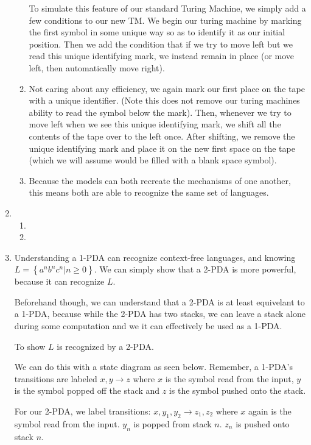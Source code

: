 \documentclass{article}
\newcommand{\set}[1]{{\left\{#1\right\}}}    %
\begin{document}
\begin{enumerate}
\begin{enumerate}
                To simulate this feature of our standard Turing Machine, we simply add a few conditions to our new TM.
                We begin our turing machine by marking the first symbol in some unique way so as to identify it as our initial position.
                Then we add the condition that if we try to move left but we read this unique identifying mark, we instead remain in place (or move left, then automatically move right).
            \item
                Not caring about any efficiency, we again mark our first place on the tape with a unique identifier. (Note this does not remove our turing machines ability to read the symbol below the mark).
                Then, whenever we try to move left when we see this unique identifying mark, we shift all the contents of the tape over to the left once.
                After shifting, we remove the unique identifying mark and place it on the new first space on the tape (which we will assume would be filled with a blank space symbol).
            \item
                Because the models can both recreate the mechanisms of one another, this means both are able to recognize the same set of languages.
        \end{enumerate}
    \item %
        \begin{enumerate}
            \item
            \item
        \end{enumerate}
    \item %
        Understanding a 1-PDA can recognize context-free languages, and knowing $L = \set{a^nb^nc^n | n \ge 0}$. We can simply show that a 2-PDA is more powerful, because it can recognize $L$.

        Beforehand though, we can understand that a 2-PDA is at least equivelant to a 1-PDA, because while the 2-PDA has two stacks, we can leave a stack alone during some computation and we it can effectively be used as a 1-PDA.

        To show $L$ is recognized by a 2-PDA.

        We can do this with a state diagram as seen below.
        Remember, a 1-PDA's transitions are labeled $x, y \rightarrow z$ where $x$ is the symbol read from the input, $y$ is the symbol popped off the stack and $z$ is the symbol pushed onto the stack.

        For our 2-PDA, we label transitions: $x,y_1,y_2\rightarrow z_1,z_2$ where $x$ again is the symbol read from the input.
        $y_n$ is popped from stack $n$. $z_n$ is pushed onto stack $n$.


\end{enumerate}
\end{document}
